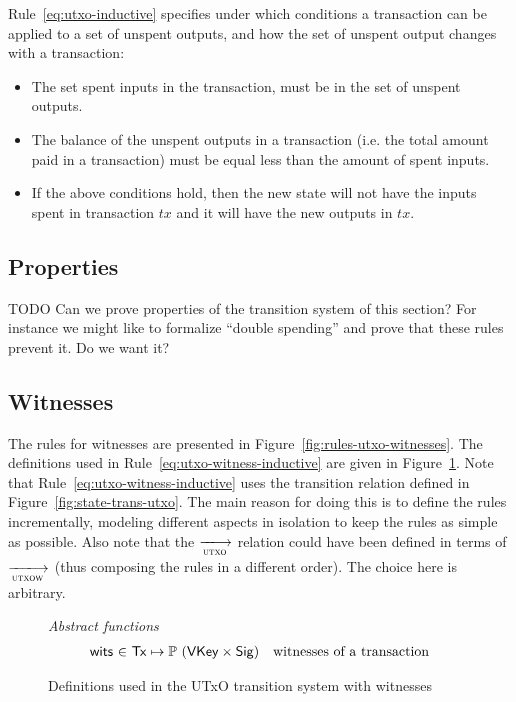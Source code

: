 \documentclass[11pt,a4paper]{article}
\newenvironment{todo}
  {\begin{bclogo}[logo=\bcoutil, couleur=red!5, couleurBarre=red, arrondi=0.2]{ TODO}}
    {\end{bclogo}}
\newcommand{\powerset}[1]{\mathbb{P}~#1}
\newcommand{\var}[1]{\mathit{#1}}
\newcommand{\fun}[1]{\mathsf{#1}}
\newcommand{\type}[1]{\mathsf{#1}}
\newcommand{\trans}[2]{\xlongrightarrow[\textsc{#1}]{#2}}
\newcommand{\Tx}{\type{Tx}}
\newcommand{\VKey}{\type{VKey}}
\newcommand{\Sig}{\type{Sig}}
\begin{document}
Rule~\ref{eq:utxo-inductive} specifies under which conditions a transaction can
be applied to a set of unspent outputs, and how the set of unspent output
changes with a transaction:
\begin{itemize}
\item The set spent inputs in the transaction, must be in the set of unspent
  outputs.
\item The balance of the unspent outputs in a transaction (i.e. the total
  amount paid in a transaction) must be equal less than the amount of spent
  inputs.
\item If the above conditions hold, then the new state will not have the inputs
  spent in transaction $\var{tx}$ and it will have the new outputs in
  $\var{tx}$.
\end{itemize}

\subsection{Properties}
\label{sec:utxo-properties}

\begin{todo}
  Can we prove properties of the transition system of this section? For
  instance we might like to formalize ``double spending'' and prove that these
  rules prevent it. Do we want it?
\end{todo}

\subsection{Witnesses}
\label{sec:witnesses}

The rules for witnesses are presented in Figure~\ref{fig:rules-utxo-witnesses}.
The definitions used in Rule~\ref{eq:utxo-witness-inductive} are given in
Figure~\ref{fig:state-trans-utxo-witnesses-defs}. Note that
Rule~\ref{eq:utxo-witness-inductive} uses the transition relation defined in
Figure~\ref{fig:state-trans-utxo}. The main reason for doing this is to define
the rules incrementally, modeling different aspects in isolation to keep the
rules as simple as possible. Also note that the $\trans{utxo}{}$ relation could
have been defined in terms of $\trans{utxow}{}$ (thus composing the rules in a
different order). The choice here is arbitrary.

\begin{figure}
  \emph{Abstract functions}
  \begin{equation*}
    \begin{array}{r@{~\in~}lr}
      \fun{wits} & \Tx \mapsto \powerset{(\VKey \times \Sig)}
      & \text{witnesses of a transaction}\\
    \end{array}
  \end{equation*}
  \caption{Definitions used in the UTxO transition system with witnesses}
  \label{fig:state-trans-utxo-witnesses-defs}
\end{figure}
\end{document}
